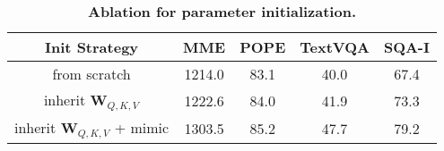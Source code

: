 \begin{table}[t!]
    \centering
    \small
    \setlength{\tabcolsep}{3pt}
    \begin{tabular}{c | c c c c}
    \toprule
    Init Strategy & MME &  POPE & TextVQA & SQA-I \\
    \midrule
    from scratch & 1214.0 & 83.1 & 40.0 & 67.4 \\
    inherit $\boldsymbol{W}_{Q,K,V}$ & 1222.6 & 84.0 & 41.9 & 73.3 \\
    \rowcolor{green!15}
    inherit $\boldsymbol{W}_{Q,K,V}$ + mimic&  1303.5 & 85.2 & 47.7 & 79.2 \\
    \bottomrule
    \end{tabular}
    \vspace{-1em}
    \caption{\textbf{Ablation for parameter initialization.} }
    \vspace{-1em}

    \label{tab:init}
 \end{table}


